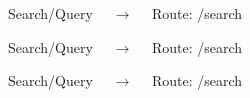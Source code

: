 \documentclass[10pt]{report}
\begin{document}
  
\begin{figure}[H]
	  \begin{center}
  	  \end{center}
	\caption{Search/Query  $\quad\rightarrow\quad$  Route:  /search} 
	\label{1}
\end{figure}
 \begin{figure}[H]
	  \begin{center}
  	  \end{center}
	\caption{Search/Query  $\quad\rightarrow\quad$  Route:  /search}
	\label{1}
\end{figure}
\begin{figure}[H]
	  \begin{center}
  	  \end{center}
	\caption{Search/Query  $\quad\rightarrow\quad$  Route:  /search}
	\label{1}
\end{figure} 
 
\end{document}

